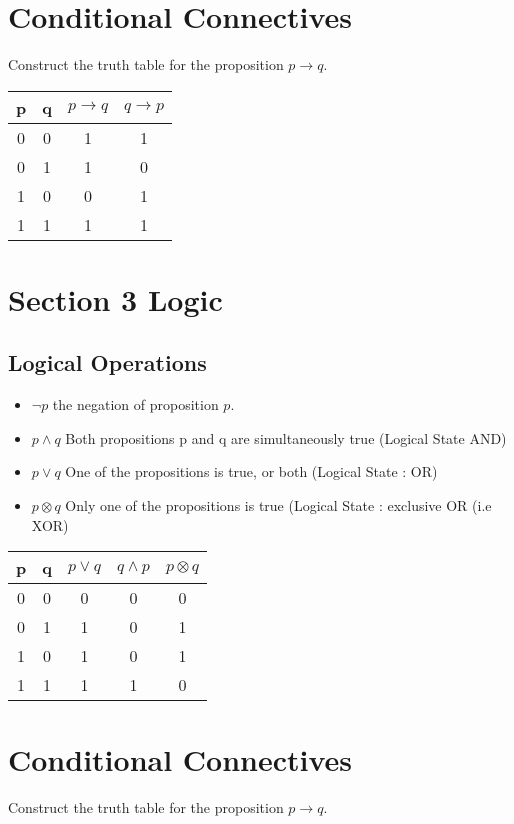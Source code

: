 \section{Conditional Connectives}
Construct the truth table for the proposition $p \rightarrow q$.

\begin{center}
\begin{tabular}{|c|c|c|c|}
\hline
p & q & $p \rightarrow q$ & $q \rightarrow p$ \\
\hline
0 & 0 & 1& 1 \\
0 & 1 & 1 & 0 \\
1 & 0 & 0 & 1 \\
1 & 1 & 1 & 1 \\
\hline
\end{tabular}
\end{center}


\section{Section 3 Logic}
\subsection{Logical Operations}
\begin{itemize}
\item $\neg p$ the negation of proposition $p$.
\item $p \wedge q$ Both propositions p and q are simultaneously true (Logical State AND)
\item $p \vee q $ One of the propositions is true, or both (Logical State : OR)
\item $p \otimes q$ Only one of the propositions is true (Logical State : exclusive OR (i.e XOR)
\end{itemize}
\begin{center}
\begin{tabular}{|c|c|c|c|c|}
\hline
p & q & $p \vee q$ & $q \wedge p$ & $p \otimes q$ \\
\hline
0 & 0 & 0 & 0 & 0 \\
0 & 1 & 1 & 0 & 1\\
1 & 0 & 1 & 0 & 1 \\
1 & 1 & 1 & 1 & 0\\
\hline
\end{tabular}
\end{center}
\section{Conditional Connectives}
Construct the truth table for the proposition $p \rightarrow q$.

